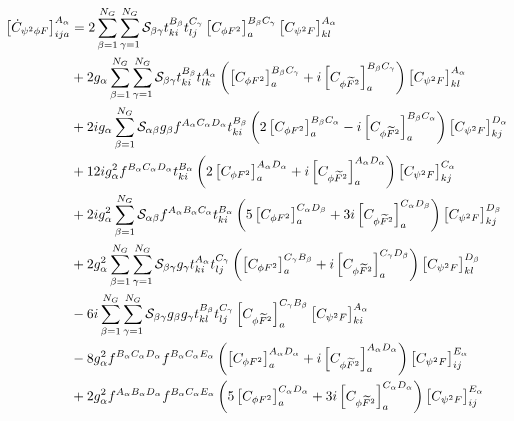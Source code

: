 \begin{align}
    \left[\dot C_{\psi^2 \phi F}\right]_{ija}^{A_\alpha} & = 2 \sum_{\beta=1}^{N_G}\sum_{\gamma=1}^{N_G} \mathcal{S}_{\beta\gamma} t_{ki}^{B_\beta} t_{lj}^{C_\gamma} \left[C_{\phi F^2}\right]_a^{B_\beta C_\gamma} \left[C_{\psi^2 F}\right]_{kl}^{A_\alpha}\nonumber\\
    &+2 g_\alpha \sum_{\beta=1}^{N_G}\sum_{\gamma=1}^{N_G} \mathcal{S}_{\beta\gamma} t_{ki}^{B_\beta} t_{lk}^{A_\alpha} \left(\left[C_{\phi F^2}\right]_a^{B_\beta C_\gamma}+i\left[C_{\phi \tildee F^2}\right]_a^{B_\beta C_\gamma}\right)\left[C_{\psi^2 F}\right]_{kl}^{A_\alpha}\nonumber\\
    &+2ig_\alpha \sum_{\beta=1}^{N_G}\mathcal{S}_{\alpha\beta} g_\beta f^{A_\alpha C_\alpha D_\alpha} t_{ki}^{B_\beta}\left(2\left[C_{\phi F^2}\right]_a^{B_\beta C_\alpha}-i\left[C_{\phi \tildee F^2}\right]_a^{B_\beta C_\alpha}\right)\left[C_{\psi^2 F}\right]_{kj}^{D_\alpha}\nonumber\\
    &+ 12 i g_\alpha^2f^{B_\alpha C_\alpha D_\alpha} t_{ki}^{B_\alpha}\left(2\left[C_{\phi F^2}\right]_a^{A_\alpha D_\alpha}+i\left[C_{\phi \tildee F^2}\right]_a^{A_\alpha D_\alpha}\right)\left[C_{\psi^2 F}\right]_{kj}^{C_\alpha}\nonumber\\
    &+ 2 i g_\alpha^2 \sum_{\beta=1}^{N_G} \mathcal{S}_{\alpha\beta} f^{A_\alpha B_\alpha C_\alpha} t_{ki}^{B_\alpha}\left(5\left[C_{\phi F^2}\right]_a^{C_\alpha D_\beta}+3i\left[C_{\phi \tildee F^2}\right]_a^{C_\alpha D_\beta}\right)\left[C_{\psi^2 F}\right]_{kj}^{D_\beta}\nonumber\\
    &+ 2 g_\alpha^2 \sum_{\beta=1}^{N_G}\sum_{\gamma=1}^{N_G} \mathcal{S}_{\beta\gamma} g_\gamma t_{ki}^{A_\alpha} t_{lj}^{C_\gamma}\left(\left[C_{\phi F^2}\right]_a^{C_\gamma B_\beta}+i\left[C_{\phi \tildee F^2}\right]_a^{C_\gamma D_\beta}\right)\left[C_{\psi^2 F}\right]_{kl}^{D_\beta}\nonumber\\
    &- 6 i \sum_{\beta=1}^{N_G}\sum_{\gamma=1}^{N_G} \mathcal{S}_{\beta\gamma} g_\beta g_\gamma t_{kl}^{B_\beta} t_{lj}^{C_\gamma}\left[C_{\phi \tildee F^2}\right]_a^{C_\gamma B_\beta}\left[C_{\psi^2 F}\right]_{ki}^{A_\alpha}\nonumber\\
    &- 8 g_\alpha^2 f^{B_\alpha C_\alpha D_\alpha} f^{B_\alpha C_\alpha E_\alpha} \left(\left[C_{\phi F^2}\right]_a^{A_\alpha D_\alpha}+i\left[C_{\phi \tildee F^2}\right]_a^{A_\alpha D_\alpha}\right)\left[C_{\psi^2 F}\right]_{ij}^{E_\alpha}\nonumber\\
    &+ 2 g_\alpha^2 f^{A_\alpha B_\alpha D_\alpha} f^{B_\alpha C_\alpha E_\alpha} \left(5\left[C_{\phi F^2}\right]_a^{C_\alpha D_\alpha}+3i\left[C_{\phi \tildee F^2}\right]_a^{C_\alpha D_\alpha}\right)\left[C_{\psi^2 F}\right]_{ij}^{E_\alpha}\nonumber\\

\end{align}
